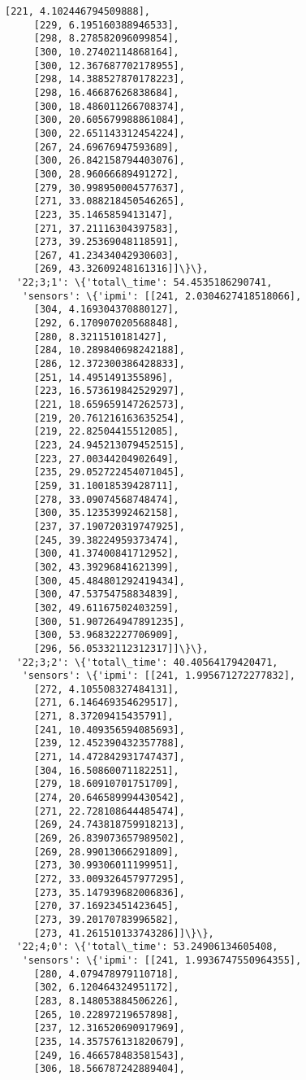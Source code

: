 \documentclass[11pt]{article}
\begin{document}
\begin{tcolorbox}[breakable, size=fbox, boxrule=.5pt, pad at break*=1mm, opacityfill=0]
\begin{Verbatim}[commandchars=\\\{\}]
     [221, 4.102446794509888],
     [229, 6.195160388946533],
     [298, 8.278582096099854],
     [300, 10.27402114868164],
     [300, 12.367687702178955],
     [298, 14.388527870178223],
     [298, 16.46687626838684],
     [300, 18.486011266708374],
     [300, 20.605679988861084],
     [300, 22.651143312454224],
     [267, 24.69676947593689],
     [300, 26.842158794403076],
     [300, 28.96066689491272],
     [279, 30.998950004577637],
     [271, 33.088218450546265],
     [223, 35.1465859413147],
     [271, 37.21116304397583],
     [273, 39.25369048118591],
     [267, 41.23434042930603],
     [269, 43.32609248161316]]\}\},
  '22;3;1': \{'total\_time': 54.4535186290741,
   'sensors': \{'ipmi': [[241, 2.0304627418518066],
     [304, 4.169304370880127],
     [292, 6.170907020568848],
     [280, 8.3211510181427],
     [284, 10.289840698242188],
     [286, 12.372300386428833],
     [251, 14.4951491355896],
     [223, 16.573619842529297],
     [221, 18.659659147262573],
     [219, 20.761216163635254],
     [219, 22.82504415512085],
     [223, 24.945213079452515],
     [223, 27.00344204902649],
     [235, 29.052722454071045],
     [259, 31.10018539428711],
     [278, 33.09074568748474],
     [300, 35.12353992462158],
     [237, 37.190720319747925],
     [245, 39.38224959373474],
     [300, 41.37400841712952],
     [302, 43.39296841621399],
     [300, 45.484801292419434],
     [300, 47.53754758834839],
     [302, 49.61167502403259],
     [300, 51.907264947891235],
     [300, 53.96832227706909],
     [296, 56.05332112312317]]\}\},
  '22;3;2': \{'total\_time': 40.40564179420471,
   'sensors': \{'ipmi': [[241, 1.995671272277832],
     [272, 4.105508327484131],
     [271, 6.146469354629517],
     [271, 8.37209415435791],
     [241, 10.409356594085693],
     [239, 12.452390432357788],
     [271, 14.472842931747437],
     [304, 16.50860071182251],
     [279, 18.60910701751709],
     [274, 20.646589994430542],
     [271, 22.728108644485474],
     [269, 24.743818759918213],
     [269, 26.839073657989502],
     [269, 28.99013066291809],
     [273, 30.99306011199951],
     [272, 33.009326457977295],
     [273, 35.147939682006836],
     [270, 37.16923451423645],
     [273, 39.20170783996582],
     [273, 41.261510133743286]]\}\},
  '22;4;0': \{'total\_time': 53.24906134605408,
   'sensors': \{'ipmi': [[241, 1.9936747550964355],
     [280, 4.079478979110718],
     [302, 6.120464324951172],
     [283, 8.148053884506226],
     [265, 10.22897219657898],
     [237, 12.316520690917969],
     [235, 14.357576131820679],
     [249, 16.466578483581543],
     [306, 18.566787242889404],

\end{Verbatim}
\end{tcolorbox}
\end{document}
